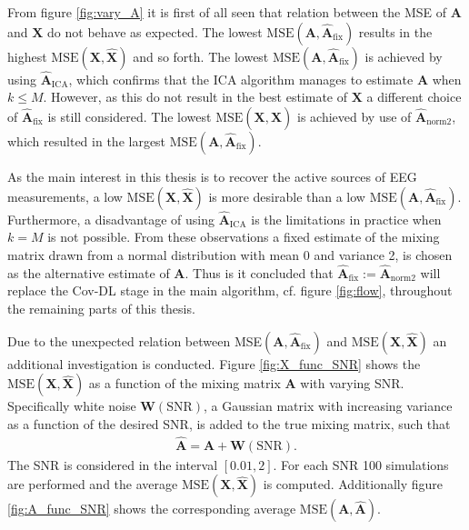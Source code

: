 From figure \ref{fig:vary_A} it is first of all seen that relation between the MSE of $\mathbf{A}$ and $\mathbf{X}$ do not behave as expected. The lowest $\text{MSE}(\mathbf{A}, \hat{\mathbf{A}}_{\text{fix}})$ results in the highest $\text{MSE}(\mathbf{X}, \hat{\mathbf{X}})$ and so forth. 
The lowest $\text{MSE}(\mathbf{A}, \hat{\mathbf{A}}_{\text{fix}})$ is achieved by using $\hat{\mathbf{A}}_{\text{ICA}}$, which confirms that the ICA algorithm manages to estimate $\mathbf{A}$ when $k \leq M$. 
However, as this do not result in the best estimate of $\mathbf{X}$ a different choice of $\hat{\mathbf{A}}_{\text{fix}}$ is still considered. 
The lowest $\text{MSE}(\mathbf{X}, \hat{\mathbf{X}})$ is achieved by use of $\hat{\mathbf{A}}_{\text{norm2}}$, which resulted in the largest $\text{MSE}(\mathbf{A}, \hat{\mathbf{A}}_{\text{fix}})$. 
      
As the main interest in this thesis is to recover the active sources of EEG measurements, a low $\text{MSE}(\mathbf{X}, \hat{\mathbf{X}})$ is more desirable than a low $\text{MSE}(\mathbf{A}, \hat{\mathbf{A}}_{\text{fix}})$. 
Furthermore, a disadvantage of using $\hat{\mathbf{A}}_{\text{ICA}}$ is the limitations in practice when $k = M$ is not possible. 
From these observations a fixed estimate of the mixing matrix drawn from a normal distribution with mean 0 and variance 2, is chosen as the alternative estimate of $\mathbf{A}$. 
Thus is it concluded that $\hat{\mathbf{A}}_{\text{fix}} := \hat{\mathbf{A}}_{\text{norm2}}$ will replace the Cov-DL stage in the main algorithm, cf. figure \ref{fig:flow}, throughout the remaining parts of this thesis. 

Due to the unexpected relation between MSE$(\mathbf{A}, \hat{\mathbf{A}}_{\text{fix}})$ and $\text{MSE}(\mathbf{X}, \hat{\mathbf{X}})$ an additional investigation is conducted. 
Figure \ref{fig:X_func_SNR} shows the $\text{MSE}(\mathbf{X}, \hat{\mathbf{X}})$ as a function of the mixing matrix $\mathbf{A}$ with varying SNR. 
Specifically white noise $\textbf{W}(\text{SNR})$, a Gaussian matrix with increasing variance as a function of the desired SNR, is added to the true mixing matrix, such that 
\begin{align*}
\hat{\textbf{A}} = \textbf{A}+\textbf{W}(\text{SNR}).
\end{align*}
The SNR is considered in the interval $[0.01, 2]$. 
For each SNR 100 simulations are performed and the average $\text{MSE}(\mathbf{X}, \hat{\mathbf{X}})$ is computed.
Additionally figure \ref{fig:A_func_SNR} shows the corresponding average $\text{MSE}(\mathbf{A}, \hat{\mathbf{A}})$.

